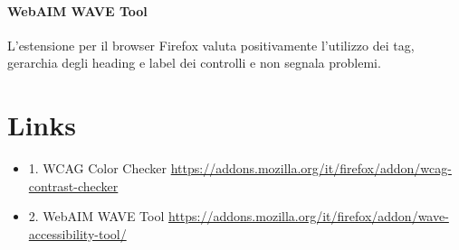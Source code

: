 \paragraph{WebAIM WAVE Tool}
L'estensione per il browser Firefox valuta positivamente l'utilizzo dei tag, gerarchia degli heading e label dei controlli e non segnala problemi.




\vfill
\section*{Links}
\begin{itemize}
    \item 1. WCAG Color Checker \url{https://addons.mozilla.org/it/firefox/addon/wcag-contrast-checker} 
    \item 2. WebAIM WAVE Tool \url{https://addons.mozilla.org/it/firefox/addon/wave-accessibility-tool/} 
\end{itemize}